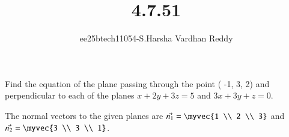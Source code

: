 \documentclass[journal]{IEEEtran}
\begin{document}

\vspace{3cm}
\title{4.7.51}
\author{ee25btech11054-S.Harsha Vardhan Reddy}
\maketitle
{\let\newpage\relax\maketitle}
\renewcommand{\thefigure}{\theenumi}
\renewcommand{\thetable}{\theenumi}
\setlength{\intextsep}{10pt} %
\renewcommand{\thetable}{\theenumi}
\begin{problem}[4.7.51]
Find the equation of the plane passing through the point ( -1, 3, 2) and perpendicular to each of the planes $x + 2y + 3z = 5$ and $3x + 3y + z = 0$.
\end{problem}

\solution
The normal vectors to the given planes are $\vec{n_1} = \myvec{1 \\ 2 \\ 3}$ and $\vec{n_2} = \myvec{3 \\ 3 \\ 1}$.
\end{document}
